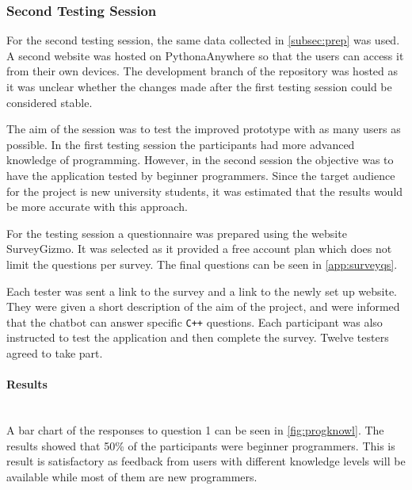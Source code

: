 \documentclass[12pt,a4paper]{article}
\newcommand{\myparagraph}[1]{\paragraph{#1}\mbox{}\\}
\begin{document}
\subsubsection{Second Testing Session}
For the second testing session, the same data collected in \cref{subsec:prep} was used. A second website was hosted on PythonaAnywhere so that the users can access it from their own devices. The development branch of the repository was hosted as it was unclear whether the changes made after the first testing session could be considered stable.

The aim of the session was to test the improved prototype with as many users as possible. In the first testing session the participants had more advanced knowledge of programming. However, in the second session the objective was to have the application tested by beginner programmers. Since the target audience for the project is new university students, it was estimated that the results would be more accurate with this approach. 

For the testing session a questionnaire was prepared using the website SurveyGizmo. It was selected as it provided a free account plan which does not limit the questions per survey. The final questions can be seen in \cref{app:surveyqs}.

Each tester was sent a link to the survey and a link to the newly set up website. They were given a short description of the aim of the project, and were informed that the chatbot can answer specific \texttt{C++} questions. Each participant was also instructed to test the application and then complete the survey. Twelve testers agreed to take part.

\myparagraph{Results}
A bar chart of the responses to question 1 can be seen in \cref{fig:progknowl}. The results showed that 50\% of the participants were beginner programmers. This is result is satisfactory as feedback from users with different knowledge levels will be available while most of them are new programmers. 
\end{document}
